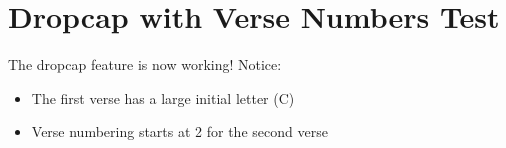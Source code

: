 \documentclass{article}
\begin{document}
\section*{Dropcap with Verse Numbers Test}

The dropcap feature is now working! Notice:
\begin{itemize}
\item The first verse has a large initial letter (C)
\item Verse numbering starts at 2 for the second verse
\end{itemize}

\end{document}
